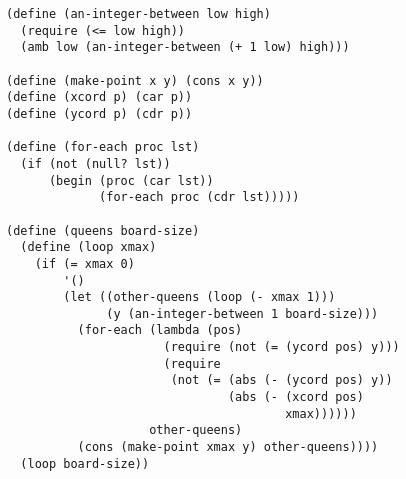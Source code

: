 \documentclass[a4paper,12pt]{article}
\begin{document}
\begin{lstlisting}
(define (an-integer-between low high)
  (require (<= low high))
  (amb low (an-integer-between (+ 1 low) high)))

(define (make-point x y) (cons x y))
(define (xcord p) (car p))
(define (ycord p) (cdr p))

(define (for-each proc lst)
  (if (not (null? lst))
      (begin (proc (car lst))
             (for-each proc (cdr lst)))))

(define (queens board-size)
  (define (loop xmax)
    (if (= xmax 0)
        '()
        (let ((other-queens (loop (- xmax 1)))
              (y (an-integer-between 1 board-size)))
          (for-each (lambda (pos)
                      (require (not (= (ycord pos) y)))
                      (require
                       (not (= (abs (- (ycord pos) y))
                               (abs (- (xcord pos)
                                       xmax))))))
                    other-queens)
          (cons (make-point xmax y) other-queens))))
  (loop board-size))
\end{lstlisting}
\end{document}
